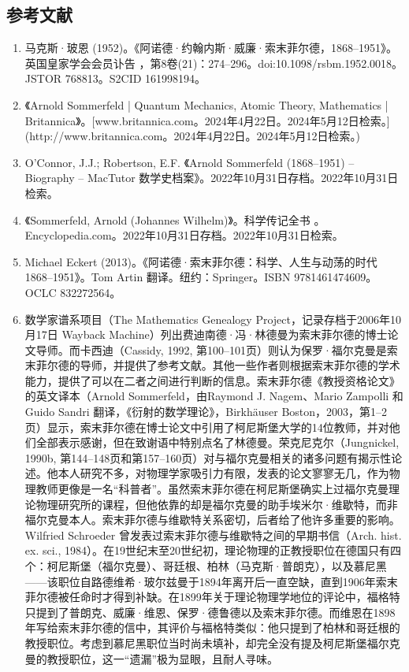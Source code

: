 \subsection{参考文献}
\begin{enumerate}
\item 马克斯·玻恩 (1952)。《阿诺德·约翰内斯·威廉·索末菲尔德，1868–1951》。英国皇家学会会员讣告 ，第8卷(21)：274–296。doi:10.1098/rsbm.1952.0018。JSTOR 768813。S2CID 161998194。
\item 《Arnold Sommerfeld | Quantum Mechanics, Atomic Theory, Mathematics | Britannica》。[www.britannica.com。2024年4月22日。2024年5月12日检索。](http://www.britannica.com。2024年4月22日。2024年5月12日检索。)
\item  O'Connor, J.J.; Robertson, E.F. 《Arnold Sommerfeld (1868–1951) – Biography – MacTutor 数学史档案》。2022年10月31日存档。2022年10月31日检索。
\item 《Sommerfeld, Arnold (Johannes Wilhelm)》。科学传记全书 。Encyclopedia.com。2022年10月31日存档。2022年10月31日检索。
\item Michael Eckert (2013)。《阿诺德·索末菲尔德：科学、人生与动荡的时代 1868–1951》。Tom Artin 翻译。纽约：Springer。ISBN 9781461474609。OCLC 832272564。
\item 数学家谱系项目（The Mathematics Genealogy Project，记录存档于2006年10月17日 Wayback Machine）列出费迪南德·冯·林德曼为索末菲尔德的博士论文导师。而卡西迪（Cassidy, 1992, 第100–101页）则认为保罗·福尔克曼是索末菲尔德的导师，并提供了参考文献。其他一些作者则根据索末菲尔德的学术能力，提供了可以在二者之间进行判断的信息。索末菲尔德《教授资格论文》的英文译本（Arnold Sommerfeld，由Raymond J. Nagem、Mario Zampolli 和 Guido Sandri 翻译，《衍射的数学理论》，Birkhäuser Boston，2003，第1–2页）显示，索末菲尔德在博士论文中引用了柯尼斯堡大学的14位教师，并对他们全部表示感谢，但在致谢语中特别点名了林德曼。荣克尼克尔（Jungnickel, 1990b, 第144–148页和第157–160页）对与福尔克曼相关的诸多问题有揭示性论述。他本人研究不多，对物理学家吸引力有限，发表的论文寥寥无几，作为物理教师更像是一名“科普者”。虽然索末菲尔德在柯尼斯堡确实上过福尔克曼理论物理研究所的课程，但他依靠的却是福尔克曼的助手埃米尔·维歇特，而非福尔克曼本人。索末菲尔德与维歇特关系密切，后者给了他许多重要的影响。Wilfried Schroeder 曾发表过索末菲尔德与维歇特之间的早期书信（Arch. hist. ex. sci., 1984）。在19世纪末至20世纪初，理论物理的正教授职位在德国只有四个：柯尼斯堡（福尔克曼）、哥廷根、柏林（马克斯·普朗克），以及慕尼黑——该职位自路德维希·玻尔兹曼于1894年离开后一直空缺，直到1906年索末菲尔德被任命时才得到补缺。在1899年关于理论物理学地位的评论中，福格特只提到了普朗克、威廉·维恩、保罗·德鲁德以及索末菲尔德。而维恩在1898年写给索末菲尔德的信中，其评价与福格特类似：他只提到了柏林和哥廷根的教授职位。考虑到慕尼黑职位当时尚未填补，却完全没有提及柯尼斯堡福尔克曼的教授职位，这一“遗漏”极为显眼，且耐人寻味。

\end{enumerate}
